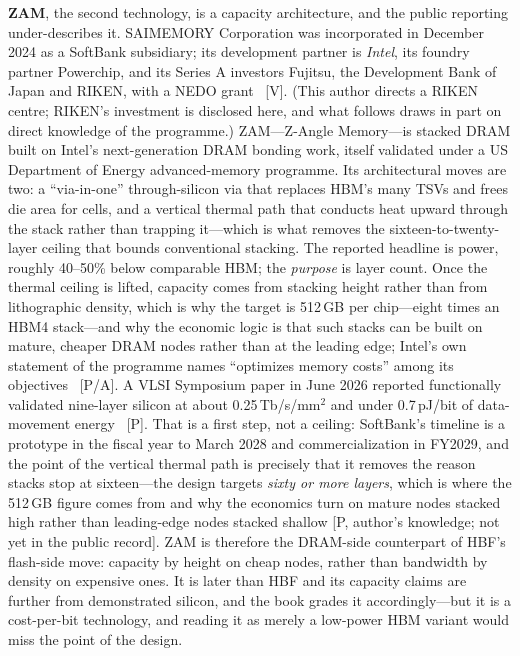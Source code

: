 \textbf{ZAM}, the second technology, is a capacity architecture, and the public reporting under-describes it. SAIMEMORY Corporation was incorporated in December 2024 as a SoftBank subsidiary; its development partner is \emph{Intel}, its foundry partner Powerchip, and its Series A investors Fujitsu, the Development Bank of Japan and RIKEN, with a NEDO grant~\cite{saimemory,zam-tech} [V]. (This author directs a RIKEN centre; RIKEN's investment is disclosed here, and what follows draws in part on direct knowledge of the programme.) ZAM---Z-Angle Memory---is stacked DRAM built on Intel's next-generation DRAM bonding work, itself validated under a US Department of Energy advanced-memory programme. Its architectural moves are two: a ``via-in-one'' through-silicon via that replaces HBM's many TSVs and frees die area for cells, and a vertical thermal path that conducts heat upward through the stack rather than trapping it---which is what removes the sixteen-to-twenty-layer ceiling that bounds conventional stacking. The reported headline is power, roughly 40--50\% below comparable HBM; the \emph{purpose} is layer count. Once the thermal ceiling is lifted, capacity comes from stacking height rather than from lithographic density, which is why the target is 512\,GB per chip---eight times an HBM4 stack---and why the economic logic is that such stacks can be built on mature, cheaper DRAM nodes rather than at the leading edge; Intel's own statement of the programme names ``optimizes memory costs'' among its objectives~\cite{zam-tech} [P/A]. A VLSI Symposium paper in June 2026 reported functionally validated nine-layer silicon at about 0.25\,Tb/s/mm$^2$ and under 0.7\,pJ/bit of data-movement energy~\cite{zam-vlsi} [P]. That is a first step, not a ceiling: SoftBank's timeline is a prototype in the fiscal year to March 2028 and commercialization in FY2029, and the point of the vertical thermal path is precisely that it removes the reason stacks stop at sixteen---the design targets \emph{sixty or more layers}, which is where the 512\,GB figure comes from and why the economics turn on mature nodes stacked high rather than leading-edge nodes stacked shallow [P, author's knowledge; not yet in the public record]. ZAM is therefore the DRAM-side counterpart of HBF's flash-side move: capacity by height on cheap nodes, rather than bandwidth by density on expensive ones. It is later than HBF and its capacity claims are further from demonstrated silicon, and the book grades it accordingly---but it is a cost-per-bit technology, and reading it as merely a low-power HBM variant would miss the point of the design.


